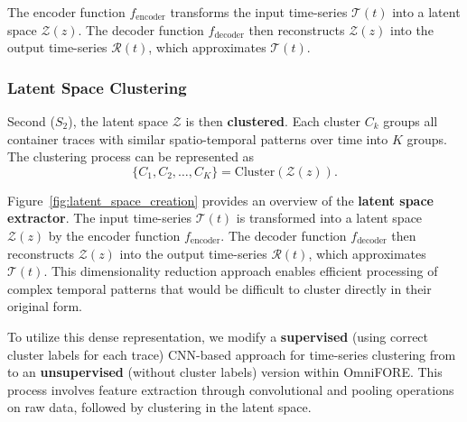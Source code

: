 The encoder function $f_{\text{encoder}}$ transforms the input time-series $\mathcal{T}(t)$ into a latent space $\mathcal{Z}(z)$. The decoder function $f_{\text{decoder}}$ then reconstructs $\mathcal{Z}(z)$ into the output time-series $\mathcal{R}(t)$, which approximates $\mathcal{T}(t)$.

\subsubsection{Latent Space Clustering}

Second ($S_2$), the latent space $\mathcal{Z}$ is then \textbf{clustered}. Each cluster $C_k$ groups all container traces with similar spatio-temporal patterns over time into $K$ groups. The clustering process can be represented as
\begin{equation}   
\{C_1, C_2, \ldots, C_K\} = \text{Cluster}(\mathcal{Z}(z)).
\end{equation}

Figure~\ref{fig:latent_space_creation} provides an overview of the \textbf{latent space extractor}. The input time-series $\mathcal{T}(t)$ is transformed into a latent space $\mathcal{Z}(z)$ by the encoder function $f_{\text{encoder}}$. The decoder function $f_{\text{decoder}}$ then reconstructs $\mathcal{Z}(z)$ into the output time-series $\mathcal{R}(t)$, which approximates $\mathcal{T}(t)$. This dimensionality reduction approach enables efficient processing of complex temporal patterns that would be difficult to cluster directly in their original form.

To utilize this dense representation, we modify a \textbf{supervised} (using correct cluster labels for each trace) \ac{CNN}-based approach for time-series clustering from~\cite{clusteringDL} to an \textbf{unsupervised} (without cluster labels) version within \ac{OmniFORE}. This process involves feature extraction through convolutional and pooling operations on raw data, followed by clustering in the latent space.

